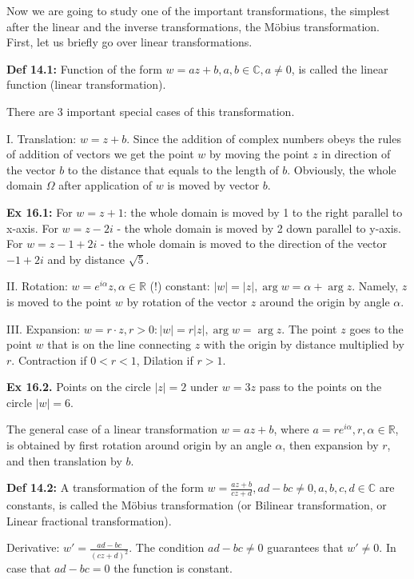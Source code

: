 \documentclass{article}
\begin{document}
Now we are going to study one of the important transformations, the simplest after the linear and the inverse transformations, the Möbius transformation. First, let us briefly go over linear transformations.

\textbf{Def 14.1:} Function of the form $w = az + b, a,b \in \mathbb{C}, a \neq 0$, is called the linear function (linear transformation).

There are 3 important special cases of this transformation.

I. Translation: $w = z + b$. Since the addition of complex numbers obeys the rules of addition of vectors we get the point $w$ by moving the point $z$ in direction of the vector $b$ to the distance that equals to the length of $b$. Obviously, the whole domain $\Omega$ after application of $w$ is moved by vector $b$.

\textbf{Ex 16.1:} For $w = z + 1$: the whole domain is moved by 1 to the right parallel to x-axis. For $w = z - 2i$ - the whole domain is moved by 2 down parallel to y-axis. For $w = z - 1 + 2i$ - the whole domain is moved to the direction of the vector $-1 + 2i$ and by distance $\sqrt{5}$.

II. Rotation: $w = e^{i\alpha}z, \alpha \in \mathbb{R}$ (!) constant: $|w| = |z|, \arg w = \alpha + \arg z$. Namely, $z$ is moved to the point $w$ by rotation of the vector $z$ around the origin by angle $\alpha$.

III. Expansion: $w = r \cdot z, r > 0: |w| = r|z|, \arg w = \arg z$. The point $z$ goes to the point $w$ that is on the line connecting $z$ with the origin by distance multiplied by $r$. Contraction if $0 < r < 1$, Dilation if $r > 1$.

\textbf{Ex 16.2.} Points on the circle $|z| = 2$ under $w = 3z$ pass to
the points on the circle $|w| = 6$.

The general case of a linear transformation $w = az + b$, where $a = re^{i\alpha}, r, \alpha \in \mathbb{R}$, is obtained by first rotation around origin by an angle $\alpha$, then expansion by $r$, and then translation by $b$.

\textbf{Def 14.2:} A transformation of the form $w = \frac{az+b}{cz+d}, ad-bc \neq 0, a,b,c,d \in \mathbb{C}$ are constants, is called the Möbius transformation (or Bilinear transformation, or Linear fractional transformation).

Derivative: $w' = \frac{ad-bc}{(cz+d)^2}$. The condition $ad-bc \neq 0$ guarantees that $w' \neq 0$. In case that $ad-bc = 0$ the function is constant.
\end{document}
